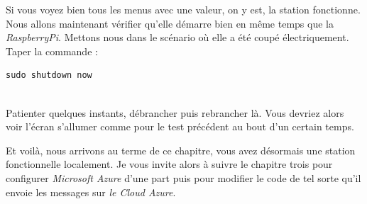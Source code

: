 Si vous voyez bien tous les menus avec une valeur, on y est, la station fonctionne. Nous allons maintenant vérifier qu'elle démarre bien en même temps que la \textit{RaspberryPi}.
Mettons nous dans le scénario où elle a été coupé électriquement. 
Taper la commande :\\ %

\begin{lstlisting}[style=MyBashStyle]
	sudo shutdown now
\end{lstlisting}\\

Patienter quelques instants, débrancher puis rebrancher là. Vous devriez alors voir l'écran s'allumer comme pour le test précédent au bout d'un certain temps. %

Et voilà, nous arrivons au terme de ce chapitre, vous avez désormais une station fonctionnelle localement. Je vous invite alors à suivre le chapitre trois pour configurer \textit{Microsoft Azure} d'une part puis pour modifier le code de tel sorte qu'il envoie les messages sur \textit{le Cloud Azure}.



	
	

